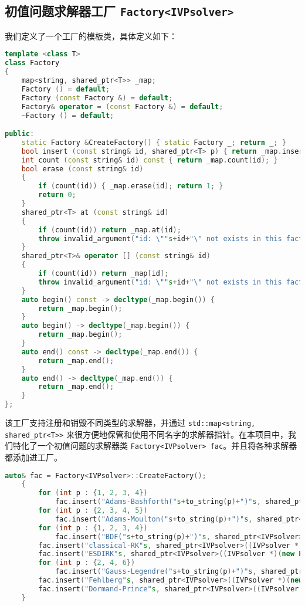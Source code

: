 \documentclass[lang=cn,a4paper,newtx,bibend=bibtex]{elegantpaper}
\begin{document}
\subsection{初值问题求解器工厂 \lstinline{Factory<IVPsolver>}}

我们定义了一个工厂的模板类，具体定义如下：
\begin{lstlisting}[language=C++]
template <class T>
class Factory
{
    map<string, shared_ptr<T>> _map;
	Factory () = default;
	Factory (const Factory &) = default;
	Factory& operator = (const Factory &) = default;
    ~Factory () = default;

public:
    static Factory &CreateFactory() { static Factory _; return _; }
    bool insert (const string& id, shared_ptr<T> p) { return _map.insert({id, p}).second; }
    int count (const string& id) const { return _map.count(id); }
    bool erase (const string& id)
    {
        if (count(id)) { _map.erase(id); return 1; }
        return 0;
    }
    shared_ptr<T> at (const string& id)
    {
        if (count(id)) return _map.at(id);
        throw invalid_argument("id: \""s+id+"\" not exists in this factory."s);
    }
    shared_ptr<T>& operator [] (const string& id)
    {
        if (count(id)) return _map[id];
        throw invalid_argument("id: \""s+id+"\" not exists in this factory."s);
    }
    auto begin() const -> decltype(_map.begin()) {
        return _map.begin();
    }
    auto begin() -> decltype(_map.begin()) {
        return _map.begin();
    }
    auto end() const -> decltype(_map.end()) {
        return _map.end();
    }
    auto end() -> decltype(_map.end()) {
        return _map.end();
    }
};
\end{lstlisting}

该工厂支持注册和销毁不同类型的求解器，并通过 \lstinline{std::map<string, shared_ptr<T>>} 来很方便地保管和使用不同名字的求解器指针。在本项目中，我们特化了一个初值问题的求解器类 \lstinline{Factory<IVPsolver> fac}。并且将各种求解器都添加进工厂。

\begin{lstlisting}[language=C++]
auto& fac = Factory<IVPsolver>::CreateFactory();
    {
        for (int p : {1, 2, 3, 4})
            fac.insert("Adams-Bashforth("s+to_string(p)+")"s, shared_ptr<IVPsolver>((IVPsolver *)(new Adams_Bashforth(p))));
        for (int p : {2, 3, 4, 5})
            fac.insert("Adams-Moulton("s+to_string(p)+")"s, shared_ptr<IVPsolver>((IVPsolver *)(new Adams_Moulton(p))));
        for (int p : {1, 2, 3, 4})
            fac.insert("BDF("s+to_string(p)+")"s, shared_ptr<IVPsolver>((IVPsolver *)(new BDF(p))));
        fac.insert("classical-RK"s, shared_ptr<IVPsolver>((IVPsolver *)(new classical_RK())));
        fac.insert("ESDIRK"s, shared_ptr<IVPsolver>((IVPsolver *)(new ESDIRK)));
        for (int p : {2, 4, 6})
            fac.insert("Gauss-Legendre("s+to_string(p)+")"s, shared_ptr<IVPsolver>((IVPsolver *)(new Gauss_Legendre_RK(p/2))));
        fac.insert("Fehlberg"s, shared_ptr<IVPsolver>((IVPsolver *)(new Fehlberg_embedded_RK)));
        fac.insert("Dormand-Prince"s, shared_ptr<IVPsolver>((IVPsolver *)(new Dormand_Prince_embedded_RK)));
    }
\end{lstlisting}
\end{document}
